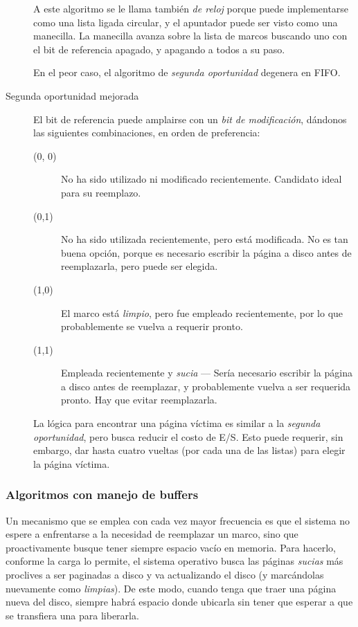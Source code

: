 \documentclass[11pt,fleqn]{book} %
\begin{document}
\begin{description}
     A este algoritmo se le llama también \emph{de reloj} porque puede
     implementarse como una lista ligada circular, y el apuntador
     puede ser visto como una manecilla. La manecilla avanza sobre la
     lista de marcos buscando uno con el bit de referencia apagado, y
     apagando a todos a su paso.

     En el peor caso, el algoritmo de \emph{segunda oportunidad} degenera
     en FIFO.
\item[Segunda oportunidad mejorada] El bit de referencia puede
     amplairse con un \emph{bit de modificación}, dándonos las siguientes
     combinaciones, en orden de preferencia:
\begin{description}
\item[(0, 0)] No ha sido utilizado ni modificado
                 recientemente. Candidato ideal para su reemplazo.
\item[(0,1)] No ha sido utilizada recientemente, pero está
                modificada. No es tan buena opción, porque es
                necesario escribir la página a disco antes de
                reemplazarla, pero puede ser elegida.
\item[(1,0)] El marco está \emph{limpio}, pero fue empleado
                recientemente, por lo que probablemente se vuelva a
                requerir pronto.
\item[(1,1)] Empleada recientemente y \emph{sucia} — Sería necesario
                escribir la página a disco antes de reemplazar, y
                probablemente vuelva a ser requerida pronto. Hay que
                evitar reemplazarla.
\end{description}
La lógica para encontrar una página víctima es similar a la
     \emph{segunda oportunidad}, pero busca reducir el costo de E/S. Esto
     puede requerir, sin embargo, dar hasta cuatro vueltas (por cada
     una de las listas) para elegir la página víctima.
\end{description}
\subsubsection{Algoritmos con manejo de buffers}
\label{sec-5-5-3-6}


Un mecanismo que se emplea con cada vez mayor frecuencia es que el
sistema no espere a enfrentarse a la necesidad de reemplazar un
marco, sino que proactivamente busque tener siempre espacio vacío en
memoria. Para hacerlo, conforme la carga lo permite, el sistema
operativo busca las páginas \emph{sucias} más proclives a ser paginadas a
disco y va actualizando el disco (y marcándolas nuevamente como
\emph{limpias}). De este modo, cuando tenga que traer una página nueva del
disco, siempre habrá espacio donde ubicarla sin tener que esperar a
que se transfiera una para liberarla.
\end{document}
